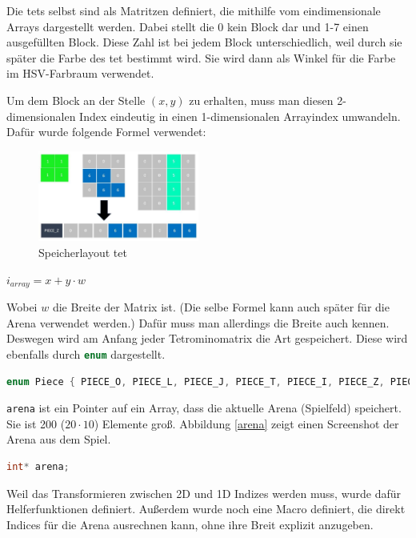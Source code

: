 \documentclass[11pt]{article}
\newcommand{\lstin}[1]{\lstinline[language=C]{#1}}
\begin{document}
Die \glspl{tet} selbst sind als Matritzen definiert, die mithilfe vom eindimensionale Arrays dargestellt werden. Dabei stellt die 0 kein Block dar und 1-7 einen ausgefüllten Block.
Diese Zahl ist bei jedem Block unterschiedlich, weil durch sie später die Farbe des \gls{tet} bestimmt wird. Sie wird dann als Winkel für die Farbe im HSV-Farbraum verwendet.

Um dem Block an der Stelle $(x, y)$ zu erhalten, muss man diesen 2-dimensionalen Index eindeutig in einen 1-dimensionalen Arrayindex umwandeln. Dafür wurde folgende Formel verwendet:

\begin{figure}[h]
  \centering
  \includegraphics[width=200px]{../images/mem_layout.jpg}
  \caption{Speicherlayout \gls{tet}}
\end{figure}

\begin{center}
  \begin{math}
    i_{array} = x + y \cdot w
  \end{math}
\end{center}

Wobei $w$ die Breite der Matrix ist. (Die selbe Formel kann auch später für die Arena verwendet werden.)
Dafür muss man allerdings die Breite auch kennen. Deswegen wird am Anfang jeder Tetrominomatrix die Art gespeichert. Diese wird ebenfalls durch \lstin{enum} dargestellt.

\begin{lstlisting}[language=C]
enum Piece { PIECE_O, PIECE_L, PIECE_J, PIECE_T, PIECE_I, PIECE_Z, PIECE_S };
\end{lstlisting}

\lstin{arena} ist ein Pointer auf ein Array, dass die aktuelle Arena (Spielfeld) speichert. Sie ist 200 ($20 \cdot 10$) Elemente groß.
Abbildung \ref{arena} zeigt einen Screenshot der Arena aus dem Spiel.
\begin{lstlisting}[language=C]
int* arena;  
\end{lstlisting}

Weil das Transformieren zwischen 2D und 1D Indizes werden muss, wurde dafür Helferfunktionen definiert. Außerdem wurde noch eine Macro definiert, die direkt Indices für die Arena ausrechnen kann, ohne ihre Breit explizit anzugeben.
\end{document}
